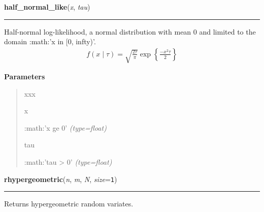     \begin{boxedminipage}{\textwidth}

    \raggedright \textbf{half\_normal\_like}(\textit{x}, \textit{tau})

    \vspace{-1.5ex}

    \rule{\textwidth}{0.5\fboxrule}

Half-normal log-likelihood, a normal distribution with mean 0 and limited
to the domain :math:'x in {[}0, infty)'.
\begin{equation*}\begin{split}f(x \mid \tau) = \sqrt{\frac{2\tau}{\pi}}\exp\left\{ {\frac{-x^2 \tau}{2}}\right\}\end{split}\end{equation*}    \vspace{1ex}

      \textbf{Parameters}
      \begin{quote}
        \begin{Ventry}{xxx}

          \item[x]


:math:'x ge 0'
            \textit{(type=float)}

          \item[tau]


:math:'tau {\textgreater} 0'
            \textit{(type=float)}

        \end{Ventry}

      \end{quote}

    \vspace{1ex}

    \end{boxedminipage}

    \label{pymc:distributions:rhypergeometric}

    \vspace{0.5ex}

    \begin{boxedminipage}{\textwidth}

    \raggedright \textbf{rhypergeometric}(\textit{n}, \textit{m}, \textit{N}, \textit{size}=\texttt{1})

    \vspace{-1.5ex}

    \rule{\textwidth}{0.5\fboxrule}

Returns hypergeometric random variates.
    \vspace{1ex}

    \end{boxedminipage}

